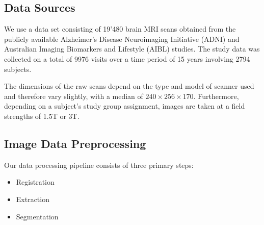 \subsection{Data Sources}
We use a data set consisting of 19'480 brain MRI scans obtained from the publicly available Alzheimer's Disease Neuroimaging Initiative (ADNI) \cite{jack2008alzheimer} and Australian Imaging Biomarkers and Lifestyle (AIBL) \cite{ellis2009australian} studies. The study data was collected on a total of 9976 visits over a time period of 15 years involving 2794 subjects.

The dimensions of the raw scans depend on the type and model of scanner used and therefore vary slightly, with a median of $ 240 \times 256 \times 170 $. Furthermore, depending on a subject's study group assignment, images are taken at a field strengths of 1.5T or 3T.

\subsection{Image Data Preprocessing}
Our data processing pipeline consists of three primary steps:

\begin{itemize}
\item Registration
\item Extraction
\item Segmentation
\end{itemize}

